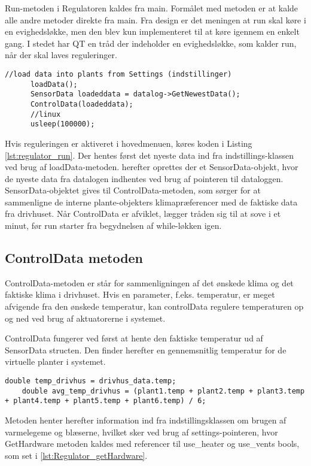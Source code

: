 Run-metoden i Regulatoren kaldes fra main. Formålet med metoden er at kalde alle andre metoder direkte fra main. Fra design er det meningen at run skal køre i en evighedsløkke, men den blev kun implementeret til at køre igennem en enkelt gang. I stedet har QT en tråd der indeholder en evighedsløkke, som kalder run, når der skal laves reguleringer.

\begin{lstlisting}[caption=Implementering af run metoden., label=lst:regulator_run]
  //load data into plants from Settings (indstillinger)
	  loadData();
	  SensorData loadeddata = datalog->GetNewestData();
	  ControlData(loadeddata);
	  //linux
	  usleep(100000);
\end{lstlisting}

Hvis reguleringen er aktiveret i hovedmenuen, køres koden i Listing \ref{lst:regulator_run}. Der hentes først det nyeste data ind fra indstillings-klassen ved brug af loadData-metoden.
herefter oprettes der et SensorData-objekt, hvor de nyeste data fra datalogen indhentes ved brug af pointeren til dataloggen. SensorData-objektet gives til ControlData-metoden, som sørger for at sammenligne de interne plante-objekters klimapræferencer med de faktiske data fra drivhuset. Når ControlData er afviklet, lægger tråden sig til at sove i et minut, før run starter fra begydnelsen af while-løkken igen.

\subsection{ControlData metoden}

ControlData-metoden er står for sammenligningen af det ønskede klima og det faktiske klima i drivhuset. Hvis en parameter, f.eks. temperatur, er meget afvigende fra den ønskede temperatur, kan controlData regulere temperaturen op og ned ved brug af aktuatorerne i systemet.

ControlData fungerer ved først at hente den faktiske temperatur ud af SensorData structen. Den finder herefter en gennemsnitlig temperatur for de virtuelle planter i systemet.

\begin{lstlisting}[caption=Implementering af ControlData metoden., label=lst:ControlData]
   double temp_drivhus = drivhus_data.temp;
    double avg_temp_drivhus = (plant1.temp + plant2.temp + plant3.temp + plant4.temp + plant5.temp + plant6.temp) / 6;
\end{lstlisting}

Metoden henter herefter information ind fra indstillingsklassen om brugen af varmelegeme og blæserne, hvilket sker ved brug af settings-pointeren, hvor GetHardware metoden kaldes med referencer til use\_heater og use\_vents bools, som set i \ref{lst:Regulator_getHardware}.

